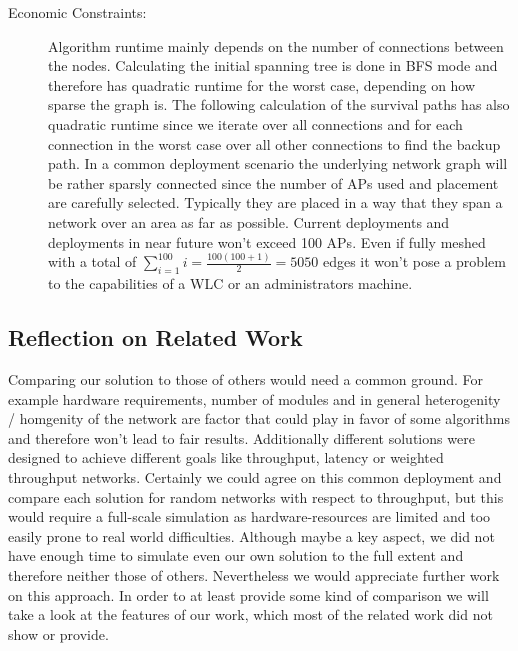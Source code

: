 \begin{description}
	\item[Economic Constraints:]
	  Algorithm runtime mainly depends on the number of connections between the nodes. Calculating the initial spanning tree is done in \ac{BFS} mode and 
	  therefore has quadratic runtime for the worst case, depending on how sparse the graph is. The following calculation of the survival paths has also quadratic runtime 
	  since we iterate over all connections and for each connection in the worst case over all other connections to find the backup path.
	  In a common deployment scenario the underlying network graph will be rather sparsly connected since the number of APs used and placement are carefully selected.
	  Typically they are placed in a way that they span a network over an area as far as possible.
	  Current deployments and deployments in near future won't exceed 100 APs. 
	  Even if fully meshed with a total of \(\sum \limits_{i=1}^{100} i = \frac{100(100+1)}{2}=5050\)
	  edges it won't pose a problem to the capabilities of a \ac{WLC} or an administrators machine.
	  
      \end{description}
      
\newpage
      
    \subsection{Reflection on Related Work}
      Comparing our solution to those of others would need a common ground. 
      For example hardware requirements, number of modules and in general heterogenity / homgenity of
      the network are factor that could play in favor of some algorithms and therefore won't lead to fair results. 
      Additionally different solutions were designed to achieve different goals like throughput, latency or weighted throughput networks. 
      Certainly we could agree on this common deployment and compare each solution for random networks with respect to throughput, 
      but this would require a full-scale simulation as hardware-resources are limited and too easily prone to real world difficulties.
      Although maybe a key aspect, we did not have enough time to simulate even our own solution to the full extent and therefore neither those of others. 
      Nevertheless we would appreciate further work on this approach. 
      In order to at least provide some kind of comparison we will take a look at the features of our work, which most of the related work did not show or provide.
      
